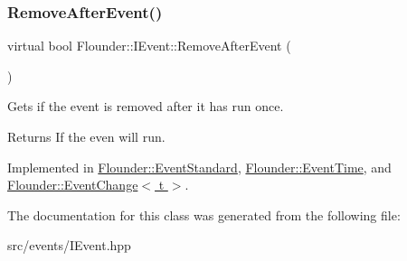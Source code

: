 \mbox{\label{class_flounder_1_1_i_event_a69893f543c31d93243833a4df1afa041}} 
\subsubsection{\texorpdfstring{Remove\+After\+Event()}{RemoveAfterEvent()}}
{\footnotesize\ttfamily virtual bool Flounder\+::\+I\+Event\+::\+Remove\+After\+Event (\begin{DoxyParamCaption}{ }\end{DoxyParamCaption})\hspace{0.3cm}{\ttfamily [pure virtual]}}



Gets if the event is removed after it has run once. 

\begin{DoxyReturn}{Returns}
If the even will run. 
\end{DoxyReturn}


Implemented in \hyperlink{class_flounder_1_1_event_standard_aa566585df82dfec06f60279112175321}{Flounder\+::\+Event\+Standard}, \hyperlink{class_flounder_1_1_event_time_a58f3a1e64668b27e3395d95a7432181a}{Flounder\+::\+Event\+Time}, and \hyperlink{class_flounder_1_1_event_change_ad13467a09f7a46260b52fae6bba11973}{Flounder\+::\+Event\+Change$<$ t $>$}.



The documentation for this class was generated from the following file\+:\begin{DoxyCompactItemize}
\item 
src/events/I\+Event.\+hpp\end{DoxyCompactItemize}
